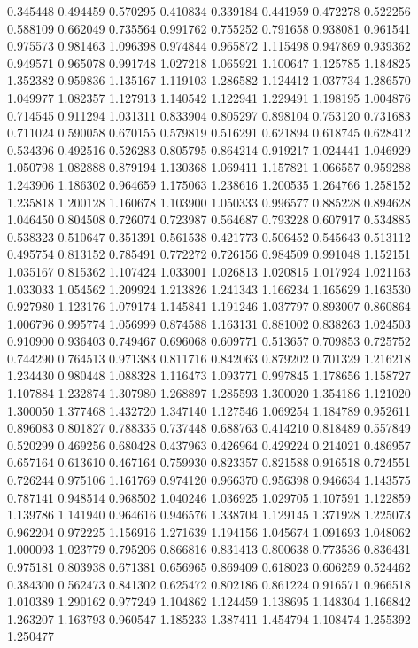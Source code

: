 0.345448
0.494459
0.570295
0.410834
0.339184
0.441959
0.472278
0.522256
0.588109
0.662049
0.735564
0.991762
0.755252
0.791658
0.938081
0.961541
0.975573
0.981463
1.096398
0.974844
0.965872
1.115498
0.947869
0.939362
0.949571
0.965078
0.991748
1.027218
1.065921
1.100647
1.125785
1.184825
1.352382
0.959836
1.135167
1.119103
1.286582
1.124412
1.037734
1.286570
1.049977
1.082357
1.127913
1.140542
1.122941
1.229491
1.198195
1.004876
0.714545
0.911294
1.031311
0.833904
0.805297
0.898104
0.753120
0.731683
0.711024
0.590058
0.670155
0.579819
0.516291
0.621894
0.618745
0.628412
0.534396
0.492516
0.526283
0.805795
0.864214
0.919217
1.024441
1.046929
1.050798
1.082888
0.879194
1.130368
1.069411
1.157821
1.066557
0.959288
1.243906
1.186302
0.964659
1.175063
1.238616
1.200535
1.264766
1.258152
1.235818
1.200128
1.160678
1.103900
1.050333
0.996577
0.885228
0.894628
1.046450
0.804508
0.726074
0.723987
0.564687
0.793228
0.607917
0.534885
0.538323
0.510647
0.351391
0.561538
0.421773
0.506452
0.545643
0.513112
0.495754
0.813152
0.785491
0.772272
0.726156
0.984509
0.991048
1.152151
1.035167
0.815362
1.107424
1.033001
1.026813
1.020815
1.017924
1.021163
1.033033
1.054562
1.209924
1.213826
1.241343
1.166234
1.165629
1.163530
0.927980
1.123176
1.079174
1.145841
1.191246
1.037797
0.893007
0.860864
1.006796
0.995774
1.056999
0.874588
1.163131
0.881002
0.838263
1.024503
0.910900
0.936403
0.749467
0.696068
0.609771
0.513657
0.709853
0.725752
0.744290
0.764513
0.971383
0.811716
0.842063
0.879202
0.701329
1.216218
1.234430
0.980448
1.088328
1.116473
1.093771
0.997845
1.178656
1.158727
1.107884
1.232874
1.307980
1.268897
1.285593
1.300020
1.354186
1.121020
1.300050
1.377468
1.432720
1.347140
1.127546
1.069254
1.184789
0.952611
0.896083
0.801827
0.788335
0.737448
0.688763
0.414210
0.818489
0.557849
0.520299
0.469256
0.680428
0.437963
0.426964
0.429224
0.214021
0.486957
0.657164
0.613610
0.467164
0.759930
0.823357
0.821588
0.916518
0.724551
0.726244
0.975106
1.161769
0.974120
0.966370
0.956398
0.946634
1.143575
0.787141
0.948514
0.968502
1.040246
1.036925
1.029705
1.107591
1.122859
1.139786
1.141940
0.964616
0.946576
1.338704
1.129145
1.371928
1.225073
0.962204
0.972225
1.156916
1.271639
1.194156
1.045674
1.091693
1.048062
1.000093
1.023779
0.795206
0.866816
0.831413
0.800638
0.773536
0.836431
0.975181
0.803938
0.671381
0.656965
0.869409
0.618023
0.606259
0.524462
0.384300
0.562473
0.841302
0.625472
0.802186
0.861224
0.916571
0.966518
1.010389
1.290162
0.977249
1.104862
1.124459
1.138695
1.148304
1.166842
1.263207
1.163793
0.960547
1.185233
1.387411
1.454794
1.108474
1.255392
1.250477

